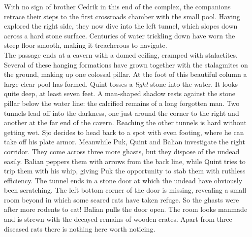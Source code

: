 With no sign of brother Cedrik in this end of the complex, the companions retrace their steps to the first crossroads chamber with the small pool. Having explored the right side, they now dive into the left tunnel, which slopes down across a hard stone surface. Centuries of water trickling down have worn the steep floor smooth, making it treacherous to navigate.\\

The passage ends at a cavern with a domed ceiling, cramped with stalactites. Several of these hanging formations have grown together with the stalagmites on the ground, making up one colossal pillar. At the foot of this beautiful column a large clear pool has formed. Quint tosses a {\itshape light} stone into the water. It looks quite deep, at least seven feet. A man-shaped shadow rests against the stone pillar below the water line: the calcified remains of a long forgotten man. Two tunnels lead off into the darkness, one just around the corner to the right and another at the far end of the cavern. Reaching the other tunnels is hard without getting wet. Sjo decides to head back to a spot with even footing, where he can take off his plate armor. Meanwhile Puk, Quint and Balian investigate the right corridor. They come across three more ghasts, but they dispose of the undead easily. Balian peppers them with arrows from the back line, while Quint tries to trip them with his whip, giving Puk the opportunity to stab them with ruthless efficiency. The tunnel ends in a stone door at which the undead have obviously been scratching. The left bottom corner of the door is missing, revealing a small room beyond in which some scared rats have taken refuge. So the ghasts were after more rodents to eat! Balian pulls the door open. The room looks manmade and is strewn with the decayed remains of wooden crates. Apart from three diseased rats there is nothing here worth noticing.\\

